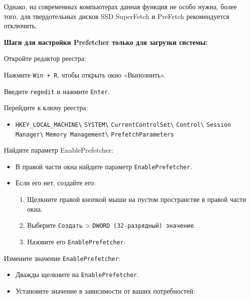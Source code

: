 \documentclass[a4paper, 14pt]{report}
\begin{document}
Однако, на современных компьютерах данная функция не особо нужна, более того, для твердотельных дисков SSD SuperFetch и PreFetch рекомендуется отключить.

\textbf{Шаги для настройки Prefetcher только для загрузки системы:}
\begin{enumerate}
    \item {Откройте редактор реестра:
    \item Нажмите \verb|Win + R|, чтобы открыть окно «Выполнить».
    \item Введите \verb|regedit| и нажмите \verb|Enter|.
          }
    \item {Перейдите к ключу реестра:
          \begin{itemize}
              \item \verb|HKEY_LOCAL_MACHINE\|
                    \verb|SYSTEM\|
                    \verb|CurrentControlSet\|
                    \verb|Control\|
                    \verb|Session Manager\|
                    \verb|Memory Management\|
                    \verb|PrefetchParameters|
          \end{itemize}}
    \item {Найдите параметр EnablePrefetcher:
          \begin{itemize}
              \item В правой части окна найдите параметр \verb|EnablePrefetcher|.
              \item {Если его нет, создайте его:
                    \begin{enumerate}
                        \item Щелкните правой кнопкой мыши на пустом пространстве в правой части окна.
                        \item Выберите \verb|Создать| > \verb|DWORD (32-разрядный) значение|.
                        \item Назовите его \verb|EnablePrefetcher|.
                    \end{enumerate}}
          \end{itemize}
          }
    \item {Измените значение \verb|EnablePrefetcher|:
          \begin{itemize}
              \item Дважды щелкните на \verb|EnablePrefetcher|.
              \item {Установите значение в зависимости от ваших потребностей:
                    \begin{itemize}

\end{itemize}}
\end{itemize}}
\end{enumerate}
\end{document}
